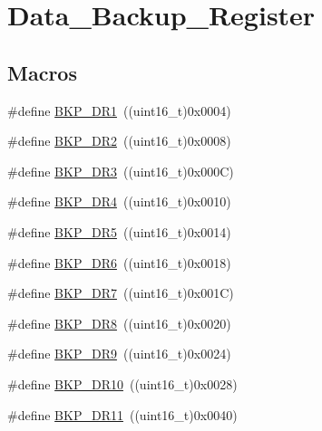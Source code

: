 \hypertarget{group___data___backup___register}{}\section{Data\+\_\+\+Backup\+\_\+\+Register}
\label{group___data___backup___register}
\subsection*{Macros}
\begin{DoxyCompactItemize}
\item 
\#define \mbox{\hyperlink{group___data___backup___register_ga5d4c3eeaccafcfc0ee3b5dc01381bab0}{B\+K\+P\+\_\+\+D\+R1}}~((uint16\+\_\+t)0x0004)
\item 
\#define \mbox{\hyperlink{group___data___backup___register_ga73867f10a3ef17eeb0d3ace641f185ad}{B\+K\+P\+\_\+\+D\+R2}}~((uint16\+\_\+t)0x0008)
\item 
\#define \mbox{\hyperlink{group___data___backup___register_gadcc77540e016c6e8dffab223af35ae88}{B\+K\+P\+\_\+\+D\+R3}}~((uint16\+\_\+t)0x000\+C)
\item 
\#define \mbox{\hyperlink{group___data___backup___register_gab327f2365ef58f3163f7fe8fa7b3c56e}{B\+K\+P\+\_\+\+D\+R4}}~((uint16\+\_\+t)0x0010)
\item 
\#define \mbox{\hyperlink{group___data___backup___register_ga21191497b79eb37ab00a1564e060e5ca}{B\+K\+P\+\_\+\+D\+R5}}~((uint16\+\_\+t)0x0014)
\item 
\#define \mbox{\hyperlink{group___data___backup___register_ga9d84a78d9c99d57844cfc557f4c047b4}{B\+K\+P\+\_\+\+D\+R6}}~((uint16\+\_\+t)0x0018)
\item 
\#define \mbox{\hyperlink{group___data___backup___register_gaed1b548c12929fbfbc57548ec1316df0}{B\+K\+P\+\_\+\+D\+R7}}~((uint16\+\_\+t)0x001\+C)
\item 
\#define \mbox{\hyperlink{group___data___backup___register_gae6ed231677e748d838f37e7ab89e51ca}{B\+K\+P\+\_\+\+D\+R8}}~((uint16\+\_\+t)0x0020)
\item 
\#define \mbox{\hyperlink{group___data___backup___register_ga69f61ba6d9ed1092dcd82a5df1a0e054}{B\+K\+P\+\_\+\+D\+R9}}~((uint16\+\_\+t)0x0024)
\item 
\#define \mbox{\hyperlink{group___data___backup___register_ga82bb6da0b7a29a737b2d2b03c0561260}{B\+K\+P\+\_\+\+D\+R10}}~((uint16\+\_\+t)0x0028)
\item 
\#define \mbox{\hyperlink{group___data___backup___register_ga7784d76b7357c12fcc2dce349b3d7b6f}{B\+K\+P\+\_\+\+D\+R11}}~((uint16\+\_\+t)0x0040)

\end{DoxyCompactItemize}
